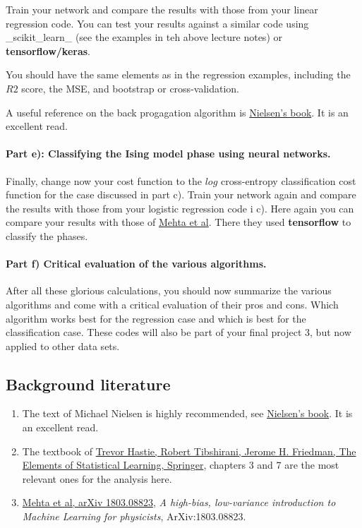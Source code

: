 \documentclass[%
oneside,                 %
final,                   %
10pt]{article}
\begin{document}
Train your network and compare the results with those from your linear regression code. 
You can test your results against a similar code using _scikit_learn_ (see the examples in teh above lecture notes) or \textbf{tensorflow/keras}. 

You should have the same elements as in the regression examples, including the $R2$ score, the MSE, and bootstrap or cross-validation.


A useful reference on the back progagation algorithm is \href{{http://neuralnetworksanddeeplearning.com/}}{Nielsen's book}. It is an excellent read.

\paragraph{Part e): Classifying the Ising model phase using neural networks.}
Finally, change now your cost function to the $log$ cross-entropy classification cost function for the case discussed in part c). Train your network again and
compare the results with those from your logistic  regression code i c). 
Here again you can compare your results with those of \href{{https://physics.bu.edu/~pankajm/ML-Notebooks/HTML/NB_CIX-DNN_ising_TFlow.html}}{Mehta et al}. There they used \textbf{tensorflow} to classify the phases. 



\paragraph{Part f) Critical evaluation of the various algorithms.}
After all these glorious calculations, you should now summarize the various algorithms and come with a critical evaluation of their pros and cons. Which algorithm works best for the regression case and which is best for the classification case. These codes will also be part of your final project 3, but now applied to other data sets.




\subsection*{Background literature}

\begin{enumerate}
\item The text of Michael Nielsen is highly recommended, see \href{{http://neuralnetworksanddeeplearning.com/}}{Nielsen's book}. It is an excellent read.

\item The textbook of \href{{https://www.springer.com/gp/book/9780387848570}}{Trevor Hastie, Robert Tibshirani, Jerome H. Friedman, The Elements of Statistical Learning, Springer}, chapters 3 and 7 are the most relevant ones for the analysis here. 

\item \href{{https://arxiv.org/abs/1803.08823}}{Mehta et al, arXiv 1803.08823}, \emph{A high-bias, low-variance introduction to Machine Learning for physicists}, ArXiv:1803.08823.
\end{enumerate}
\end{document}
